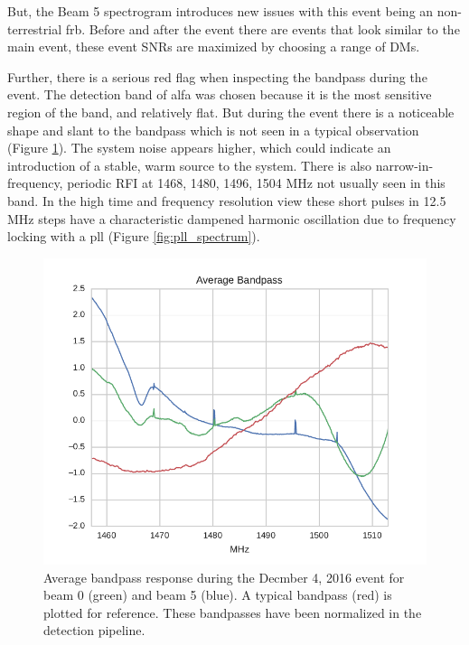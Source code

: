 \documentclass[a4paper,fleqn,usenatbib]{mnras}
\begin{document}
But, the Beam 5 spectrogram introduces new issues with this event being an
non-terrestrial \gls{frb}. Before and after the event there are events that look
similar to the main event, these event SNRs are maximized by choosing a range of
DMs.

Further, there is a serious red flag when inspecting the bandpass during the
event. The detection band of \gls{alfa} was chosen because it is the most
sensitive region of the band, and relatively flat. But during the event there is
a noticeable shape and slant to the bandpass which is not seen in a typical
observation (Figure \ref{fig:bandpass_response}). The system noise appears
higher, which could indicate an introduction of a stable, warm source to the
system. There is also narrow-in-frequency, periodic RFI at 1468, 1480, 1496,
1504 MHz not usually seen in this band. In the high time and frequency
resolution view these short pulses in 12.5 MHz steps have a characteristic
dampened harmonic oscillation due to frequency locking with a \gls{pll} (Figure
\ref{fig:pll_spectrum}).
%
\begin{figure}
    \includegraphics[width=1.0\linewidth]{figures/bandpass_response.pdf}
    \caption{Average bandpass response during the Decmber 4, 2016 event for beam
    0 (green) and beam 5 (blue). A typical bandpass (red) is plotted for
    reference. These bandpasses have been normalized in the detection pipeline.
    }
    \label{fig:bandpass_response}
\end{figure}
%
\end{document}
